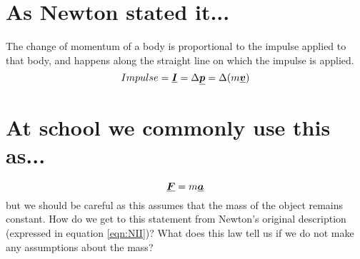 





\addtolength{\topmargin}{-0.7 cm}
\setlength{\columnsep}{22pt}

\section{As Newton stated it...}
The change of momentum of a body is proportional to the impulse applied to that body, and happens along the straight line on which the impulse is applied.
\begin{equation}
Impulse=\mathit{\underline{\boldsymbol{I}}} = \Delta{\mathit{\underline{\boldsymbol{p}}}} = \Delta(m \mathit{\underline{\boldsymbol{v}}}) \label{eqn:NII}
\end{equation}

\section{At school we commonly use this as...}
\begin{equation}
{\mathit{\underline{\boldsymbol{F}}}}=m{\mathit{\underline{\boldsymbol{a}}}}
\end{equation}
but we should be careful as this assumes that the mass of the object remains constant.  How do we get to this statement from Newton's original description (expressed in equation \ref{eqn:NII})?  What does this law tell us if we do not make any assumptions about the mass?
